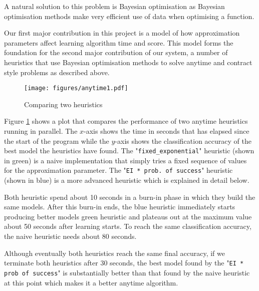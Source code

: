\documentclass[a4paper,12pt,twoside,openright]{report}
\begin{document}
A natural solution to this problem is Bayesian optimisation as Bayesian optimisation methods make very efficient use of data when optimising a function.


Our first major contribution in this project is a model of how approximation parameters affect learning algorithm time and score. This model forms the foundation for the second major contribution of our system, a number of heuristics that use Bayesian optimisation methods to solve anytime and contract style problems as described above.



\begin{figure}
\centering
  \texttt{[image: figures/anytime1.pdf]}
  \caption{Comparing two heuristics}
  \label{anytime1}
\end{figure}


Figure \ref{anytime1} shows a plot that compares the performance of two anytime heuristics running in parallel. The $x$-axis shows the time in seconds that has elapsed since the start of the program while the $y$-axis shows the classification accuracy of the best model the heuristics have found. The "\texttt{fixed\_exponential}" heuristic (shown in green) is a naive implementation that simply tries a fixed sequence of values for the approximation parameter. The "\texttt{EI * prob.\ of success}" heuristic (shown in blue) is a more advanced heuristic which is explained in detail below. 

Both heuristic spend about 10 seconds in a burn-in phase in which they build the same models. After this burn-in ends, the blue heuristic immediately starts producing better models green heuristic and plateaus out at the maximum value about 50 seconds after learning starts. To reach the same classification accuracy, the naive heuristic needs about 80 seconds.

Although eventually both heuristics reach the same final accuracy, if we terminate both heuristics after 30 seconds, the best model found by the "\texttt{EI * prob of success}" is substantially better than that found by the naive heuristic at this point which makes it a better anytime algorithm. 

\end{document}
